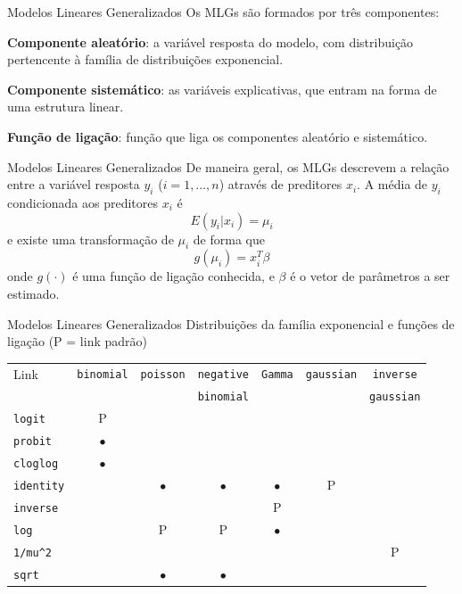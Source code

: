 \documentclass[10pt]{beamer}\usepackage[]{graphicx}\usepackage[]{color}
\theoremstyle{definition}
\begin{document}
\begin{frame}[fragile=singleslide]{Modelos Lineares Generalizados}
Os MLGs são formados por três componentes:
\begin{compactenum}
\item \textbf{Componente aleatório}: a variável resposta do modelo, com
  distribuição pertencente à família de distribuições exponencial.
\item \textbf{Componente sistemático}: as variáveis explicativas, que
  entram na forma de uma estrutura linear.
\item \textbf{Função de ligação}: função que liga os componentes
  aleatório e sistemático.
\end{compactenum}
\end{frame}

\begin{frame}[fragile=singleslide]{Modelos Lineares Generalizados}
De maneira geral, os MLGs descrevem a relação entre a variável resposta
$y_i$ ($i = 1, \ldots, n$) através de preditores $x_i$. A média de $y_i$
condicionada aos preditores $x_i$ é
\begin{equation*}
  E(y_i|x_i) = \mu_i
\end{equation*}
e existe uma transformação de $\mu_i$ de forma que
\begin{equation*}
  g(\mu_i) = x_{i}^{T}\beta
\end{equation*}
onde $g(\cdot)$ é uma função de ligação conhecida, e $\beta$ é o vetor
de parâmetros a ser estimado.
\end{frame}

\begin{frame}[fragile=singleslide]{Modelos Lineares Generalizados}
Distribuições da família exponencial e funções de ligação (P = link
padrão)
\begin{center}
\begin{table}[h!]
\renewcommand{\baselinestretch}{1}
\small\footnotesize\scriptsize
\begin{tabular}{lcccccc}
\hline
Link & \texttt{binomial} & \texttt{poisson} & \texttt{negative} &
\texttt{Gamma} & \texttt{gaussian} & \texttt{inverse}\\
    &       &    & \texttt{binomial} &  &  & \texttt{gaussian} \\
\hline
\texttt{logit} & P & & & & & \\
\texttt{probit} & $\bullet$ & & & & &  \\
\texttt{cloglog} & $\bullet$ & & & & &  \\
\texttt{identity} &  & $\bullet$ & $\bullet$ & $\bullet$ & P &  \\
\texttt{inverse} &  & & & P & &  \\
\texttt{log} &  & P & P & $\bullet$ & &  \\
\verb|1/mu^2| & & & & & & P  \\
\texttt{sqrt} & & $\bullet$ & $\bullet$ & & &  \\
\hline
\end{tabular}
\end{table}
\end{center}
\end{frame}
\end{document}
